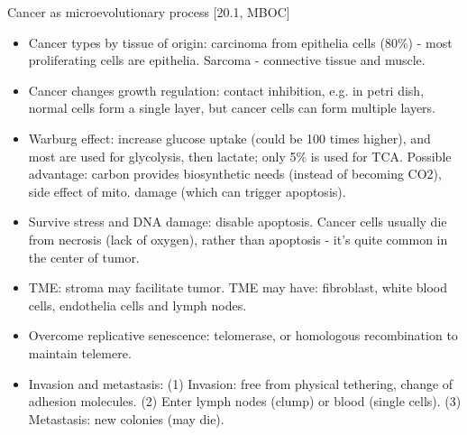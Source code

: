 \documentclass{report}
\begin{document}
Cancer as microevolutionary process [20.1, MBOC]
\begin{itemize}
	\item Cancer types by tissue of origin: carcinoma from epithelia cells (80\%) - most proliferating cells are epithelia. Sarcoma - connective tissue and muscle.  
	
	\item Cancer changes growth regulation: contact inhibition, e.g. in petri dish, normal cells form a single layer, but cancer cells can form multiple layers. 
	
	\item Warburg effect: increase glucose uptake (could be 100 times higher), and most are used for glycolysis, then lactate; only 5\% is used for TCA. Possible advantage: carbon provides biosynthetic needs (instead of becoming CO2), side effect of mito. damage (which can trigger apoptosis). 
	
	\item Survive stress and DNA damage: disable apoptosis. Cancer cells usually die from necrosis (lack of oxygen), rather than apoptosis - it’s quite common in the center of tumor. 
	
	\item TME: stroma may facilitate tumor. TME may have: fibroblast, white blood cells, endothelia cells and lymph nodes. 
	
	\item Overcome replicative senescence: telomerase, or homologous recombination to maintain telemere. 
	
	\item Invasion and metastasis: (1) Invasion: free from physical tethering, change of adhesion molecules. (2) Enter lymph nodes (clump) or blood (single cells). (3) Metastasis: new colonies (may die). 
\end{itemize}
\end{document}
